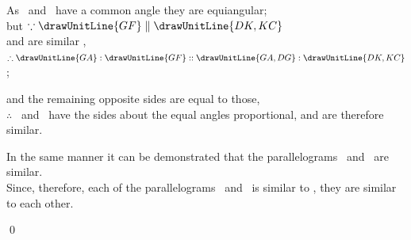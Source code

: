 \documentclass[booklanguage=english]{byrnebook}
\begin{document}
\begin{center}
As \parallelogramABCD\ and \parallelogramAEFG\ have a common angle they are equiangular;\\
but $\because \drawUnitLine{GF} \parallel \drawUnitLine{DK,KC}$\\ %
and
are similar ,\\
$\therefore \drawUnitLine{GA} : \drawUnitLine{GF} :: \drawUnitLine{GA,DG} : \drawUnitLine{DK,KC}$;

and the remaining opposite sides are equal to those,\\
$\therefore$ \parallelogramAEFG\ and \parallelogramABCD\ have the sides about the equal angles proportional, and are therefore similar.

In the same manner it can be demonstrated that the parallelograms \parallelogramABCD\ and \parallelogramFHCK\ are similar.\\
Since, therefore, each of the parallelograms \parallelogramAEFG\ and \parallelogramFHCK\ is similar to \parallelogramABCD, they are similar to each other.
\end{center}

\qed
\end{document}
